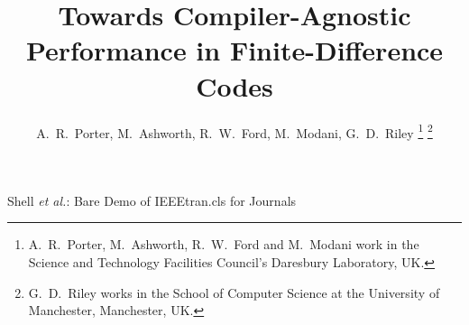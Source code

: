 \documentclass[journal]{IEEEtran}
\begin{document}
%
\title{Towards Compiler-Agnostic Performance in Finite-Difference Codes}
%
%

\author{ A.~R.~Porter, M.~Ashworth, R.~W.~Ford, M.~Modani, G.~D.~Riley%
\thanks{A.~R.~Porter, M.~Ashworth, R.~W.~Ford and M.~Modani work in the Science and Technology Facilities Council's Daresbury Laboratory, UK.}%
\thanks{G.~D.~Riley works in the School of Computer Science at the University of Manchester, Manchester, UK.}
}

% 
%


%
{Shell \MakeLowercase{\textit{et al.}}: Bare Demo of IEEEtran.cls for Journals}
% 




\end{document}
